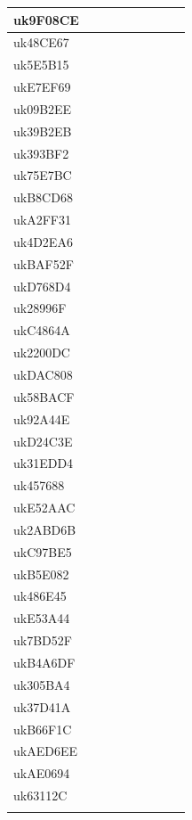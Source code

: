 \documentclass[english]{article}
\begin{document}
\begin{center}
\begin{longtable}{|l|c|c|c|c|c|c|c|c|}
\hline
uk9F08CE &  &  &  &  &  & & \\
\hline
uk48CE67 &  &  &  &  &  & & \\
\hline
uk5E5B15 &  &  &  &  &  & & \\
\hline
ukE7EF69 &  &  &  &  &  & & \\
\hline
uk09B2EE &  &  &  &  &  & & \\
\hline
uk39B2EB &  &  &  &  &  & & \\
\hline
uk393BF2 &  &  &  &  &  & & \\
\hline
uk75E7BC &  &  &  &  &  & & \\
\hline
ukB8CD68 &  &  &  &  &  & & \\
\hline
ukA2FF31 &  &  &  &  &  & & \\
\hline
uk4D2EA6 &  &  &  &  &  & & \\
\hline
ukBAF52F &  &  &  &  &  & & \\
\hline
ukD768D4 &  &  &  &  &  & & \\
\hline
uk28996F &  &  &  &  &  & & \\
\hline
ukC4864A &  &  &  &  &  & & \\
\hline
uk2200DC &  &  &  &  &  & & \\
\hline
ukDAC808 &  &  &  &  &  & & \\
\hline
uk58BACF &  &  &  &  &  & & \\
\hline
uk92A44E &  &  &  &  &  & & \\
\hline
ukD24C3E &  &  &  &  &  & & \\
\hline
uk31EDD4 &  &  &  &  &  & & \\
\hline
uk457688 &  &  &  &  &  & & \\
\hline
ukE52AAC &  &  &  &  &  & & \\
\hline
uk2ABD6B &  &  &  &  &  & & \\
\hline
ukC97BE5 &  &  &  &  &  & & \\
\hline
ukB5E082 &  &  &  &  &  & & \\
\hline
uk486E45 &  &  &  &  &  & & \\
\hline
ukE53A44 &  &  &  &  &  & & \\
\hline
uk7BD52F &  &  &  &  &  & & \\
\hline
ukB4A6DF &  &  &  &  &  & & \\
\hline
uk305BA4 &  &  &  &  &  & & \\
\hline
uk37D41A &  &  &  &  &  & & \\
\hline
ukB66F1C &  &  &  &  &  & & \\
\hline
ukAED6EE &  &  &  &  &  & & \\
\hline
ukAE0694 &  &  &  &  &  & & \\
\hline
uk63112C &  &  &  &  &  & & \\
\hline
\hline
  \label{tab: Available Data}
\end{longtable}
\end{center}
\end{document}
